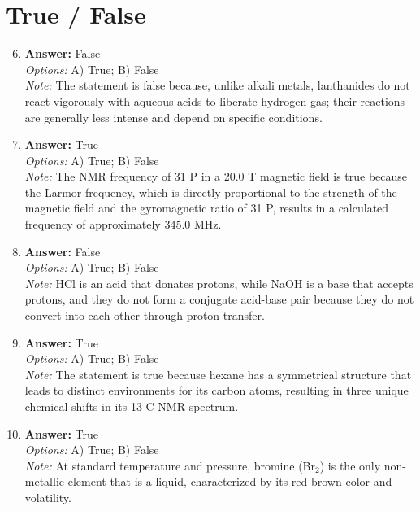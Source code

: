 \documentclass[12pt]{article}
\begin{document}
\section*{True / False}
\begin{enumerate}[label=\arabic*.]
\setcounter{enumi}{5}
\item \textbf{Answer:} False
\\ \textit{Options:} A) True; B) False
\\ \textit{Note:} The statement is false because, unlike alkali metals, lanthanides do not react vigorously with aqueous acids to liberate hydrogen gas; their reactions are generally less intense and depend on specific conditions.
\item \textbf{Answer:} True
\\ \textit{Options:} A) True; B) False
\\ \textit{Note:} The NMR frequency of 31 P in a 20.0 T magnetic field is true because the Larmor frequency, which is directly proportional to the strength of the magnetic field and the gyromagnetic ratio of 31 P, results in a calculated frequency of approximately 345.0 MHz.
\item \textbf{Answer:} False
\\ \textit{Options:} A) True; B) False
\\ \textit{Note:} HCl is an acid that donates protons, while NaOH is a base that accepts protons, and they do not form a conjugate acid-base pair because they do not convert into each other through proton transfer.
\item \textbf{Answer:} True
\\ \textit{Options:} A) True; B) False
\\ \textit{Note:} The statement is true because hexane has a symmetrical structure that leads to distinct environments for its carbon atoms, resulting in three unique chemical shifts in its 13 C NMR spectrum.
\item \textbf{Answer:} True
\\ \textit{Options:} A) True; B) False
\\ \textit{Note:} At standard temperature and pressure, bromine (Br$_{2}$) is the only non-metallic element that is a liquid, characterized by its red-brown color and volatility.
\end{enumerate}
\end{document}
